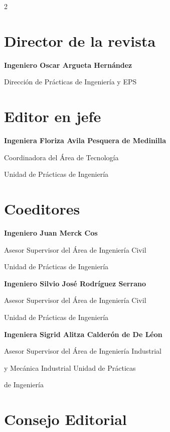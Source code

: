 \documentclass[12pt,spanish,Letterpaper,openany]{book}
\newcommand{\spacethreemilis}{\vspace{3mm}}
\begin{document}
\begin {multicols}{2}

\hypertarget{director}{%
\section*{Director de la revista}\label{director}}

\textbf{Ingeniero Oscar Argueta Hernández}

Dirección de Prácticas de Ingeniería y EPS

\hypertarget{editor}{%
\section*{Editor en jefe}\label{editor}}

\textbf{Ingeniera Floriza Avila Pesquera de Medinilla}

Coordinadora del Área de Tecnología

Unidad de Prácticas de Ingeniería

\hypertarget{coeditores}{%
\section*{Coeditores}\label{coeditores}}

\textbf{Ingeniero Juan Merck Cos}

Asesor Supervisor del Área de Ingeniería Civil

Unidad de Prácticas de Ingeniería

\spacethreemilis

\textbf{Ingeniero Silvio José Rodríguez Serrano}

Asesor Supervisor del Área de Ingeniería Civil

Unidad de Prácticas de Ingeniería

\spacethreemilis

\textbf{Ingeniera Sigrid Alitza Calderón de De Léon}

Asesor Supervisor del Área de Ingeniería Industrial

y Mecánica Industrial Unidad de Prácticas

de Ingeniería

\spacethreemilis

\hypertarget{consejoeditorial}{%
\section*{Consejo Editorial}\label{consejoeditorial}}


\end{multicols}
\end{document}
